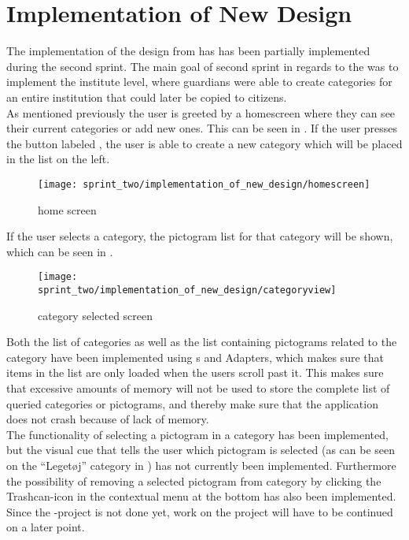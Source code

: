 \section{Implementation of New Design}
\label{sec:implementation_of_new_design}

The implementation of the design from  has has been partially implemented during the second sprint. The main goal of second sprint in regards to the \ct was to implement the institute level, where guardians were able to create categories for an entire institution that could later be copied to citizens.\\

As mentioned previously the user is greeted by a homescreen where they can see their current categories or add new ones. This can be seen in . If the user presses the button labeled , the user is able to create a new category which will be placed in the list on the left. 

\begin{figure}[!htbp]
    \centering
    \texttt{[image: sprint\_two/implementation\_of\_new\_design/homescreen]}
    \caption{\ct home screen}
    \label{fig:ct_home_screen}
\end{figure}

If the user selects a category, the pictogram list for that category will be shown, which can be seen in .\\

\begin{figure}[!htbp]
    \centering
    \texttt{[image: sprint\_two/implementation\_of\_new\_design/categoryview]}
    \caption{\ct category selected screen}
    \label{fig:ct_category_view}
\end{figure}


Both the list of categories as well as the list containing pictograms related to the category have been implemented using s and Adapters, which makes sure that items in the list are only loaded when the users scroll past it. This makes sure that excessive amounts of memory will not be used to store the complete list of queried categories or pictograms, and thereby make sure that the application does not crash because of lack of memory. \\

The functionality of selecting a pictogram in a category has been implemented, but the visual cue that tells the user which pictogram is selected (as can be seen on the ``Leget\o j'' category in ) has not currently been implemented. Furthermore the possibility of removing a selected pictogram from category by clicking the Trashcan-icon in the contextual menu at the bottom has also been implemented. Since the \ct-project is not done yet, work on the project will have to be continued on a later point. 